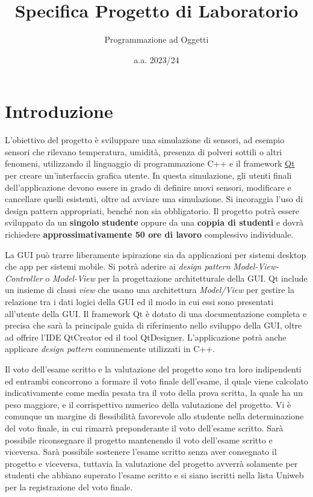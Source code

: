 \documentclass[10pt,a4paper,oneside]{article}
\title{Specifica Progetto di Laboratorio}
\author{Programmazione ad Oggetti}
\date{a.a. 2023/24}
\begin{document}
\maketitle

\section{Introduzione}
L'obiettivo del progetto è sviluppare una simulazione di sensori, ad esempio sensori che rilevano temperatura, umidità, presenza di polveri sottili o altri fenomeni, utilizzando il linguaggio di programmazione C++ e il framework \href{https://www.qt.io/?hsLang=en}{Qt} per creare un'interfaccia grafica utente. In questa simulazione, gli utenti finali dell'applicazione devono essere in grado di definire nuovi sensori, modificare e cancellare quelli esistenti, oltre ad avviare una simulazione. Si incoraggia l'uso di design pattern appropriati, benché non sia obbligatorio. Il progetto potrà essere sviluppato da un \textbf{singolo studente} oppure da una \textbf{coppia di studenti} e dovrà richiedere \textbf{approssimativamente 50 ore di lavoro} complessivo individuale.

La GUI può  trarre liberamente ispirazione sia da applicazioni per sistemi desktop che app per sistemi mobile. Si potrà aderire ai \emph{design pattern} \emph{Model-View-Controller} o \emph{Model-View} per la progettazione architetturale della GUI. Qt include un insieme di classi \emph{view} che usano una architettura \emph{Model/View} per gestire la relazione tra i dati logici della GUI ed il modo in cui essi sono presentati all'utente della GUI. Il framework Qt è dotato di una documentazione completa e precisa che sarà la principale guida di riferimento nello sviluppo della GUI, oltre ad offrire l'IDE QtCreator ed il tool QtDesigner. L'applicazione potrà anche applicare \emph{design pattern} comunemente utilizzati in C++.

Il voto dell'esame scritto e la valutazione del progetto sono tra loro indipendenti ed entrambi concorrono a formare il voto finale dell'esame, il quale viene calcolato indicativamente come media pesata tra il voto della prova scritta, la quale ha un peso maggiore, e il corrispettivo numerico della valutazione del progetto. Vi è comunque un margine di flessibilità favorevole allo studente nella determinazione del voto finale, in cui rimarrà preponderante il voto dell'esame scritto. Sarà possibile riconsegnare il progetto mantenendo il voto dell'esame scritto e viceversa. Sarà possibile sostenere l'esame scritto senza aver consegnato il progetto e viceversa, tuttavia la valutazione del progetto avverrà solamente per studenti che abbiano superato l'esame scritto e si siano iscritti nella lista Uniweb per la registrazione del voto finale.
\end{document}
